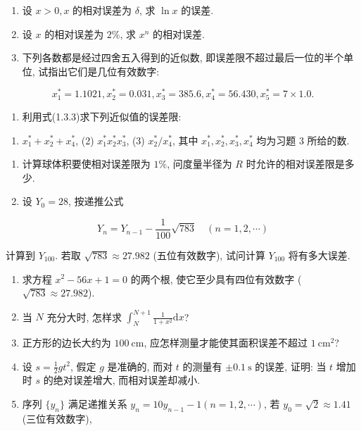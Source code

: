 \begin{enumerate}
\def\labelenumi{\arabic{enumi}.}
\item
  设 \(x>0, x\) 的相对误差为 \(\delta\), 求 \(\ln x\) 的误差.
\item
  设 \(x\) 的相对误差为 \(2\%\), 求 \(x^n\) 的相对误差.
\item
  下列各数都是经过四舍五入得到的近似数, 即误差限不超过最后一位的半个单位, 试指出它们是几位有效数字:
\end{enumerate}

\[
x_1^* = 1.1021, x_2^* = 0.031, x_3^* = 385.6, x_4^* = 56.430, x_5^* = 7 \times 1.0.
\]

\begin{enumerate}
\def\labelenumi{\arabic{enumi}.}
\setcounter{enumi}{3}
\tightlist
\item
  利用式(1.3.3)求下列近似值的误差限:
\end{enumerate}

\begin{enumerate}
\def\labelenumi{(\arabic{enumi})}
\tightlist
\item
  \(x_1^* + x_2^* + x_4^*\), (2) \(x_1^* x_2^* x_3^*\), (3) \(x_2^* / x_4^*\), 其中 \(x_1^*, x_2^*, x_3^*, x_4^*\) 均为习题 3 所给的数.
\end{enumerate}

\begin{enumerate}
\def\labelenumi{\arabic{enumi}.}
\setcounter{enumi}{4}
\item
  计算球体积要使相对误差限为 \(1\%\), 问度量半径为 \(R\) 时允许的相对误差限是多少.
\item
  设 \(Y_0=28\), 按递推公式
\end{enumerate}

\[
Y_n = Y_{n-1} - \frac{1}{100} \sqrt{783} \quad (n=1,2,\cdots)
\]

计算到 \(Y_{100}\). 若取 \(\sqrt{783} \approx 27.982\) (五位有效数字), 试问计算 \(Y_{100}\) 将有多大误差.

\begin{enumerate}
\def\labelenumi{\arabic{enumi}.}
\setcounter{enumi}{6}
\item
  求方程 \(x^2-56x+1=0\) 的两个根, 使它至少具有四位有效数字 (\(\sqrt{783} \approx 27.982\)).
\item
  当 \(N\) 充分大时, 怎样求 \(\int_N^{N+1} \frac{1}{1+x^2} \mathrm{d}x\)?
\item
  正方形的边长大约为 \(100 \mathrm{~cm}\), 应怎样测量才能使其面积误差不超过 \(1 \mathrm{~cm}^2\)?
\item
  设 \(s=\frac{1}{2} g t^2\), 假定 \(g\) 是准确的, 而对 \(t\) 的测量有 \(\pm 0.1 \mathrm{~s}\) 的误差, 证明: 当 \(t\) 增加时 \(s\) 的绝对误差增大, 而相对误差却减小.
\item
  序列 \(\{y_n\}\) 满足递推关系 \(y_n=10y_{n-1}-1 (n=1,2,\cdots)\), 若 \(y_0=\sqrt{2} \approx 1.41\) (三位有效数字),
\end{enumerate}

